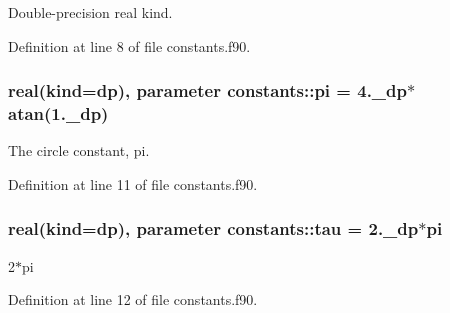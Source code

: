 Double-\/precision real kind. 



Definition at line 8 of file constants.\+f90.

\subsubsection[{\texorpdfstring{pi}{pi}}]{\setlength{\rightskip}{0pt plus 5cm}real(kind={\bf dp}), parameter constants\+::pi = 4.\+\_\+dp$\ast$atan(1.\+\_\+dp)}\hypertarget{namespaceconstants_a6b3bd07bfab41d9c44a226e58a25abb2}{}\label{namespaceconstants_a6b3bd07bfab41d9c44a226e58a25abb2}


The circle constant, pi. 



Definition at line 11 of file constants.\+f90.

\subsubsection[{\texorpdfstring{tau}{tau}}]{\setlength{\rightskip}{0pt plus 5cm}real(kind={\bf dp}), parameter constants\+::tau = 2.\+\_\+dp$\ast$pi}\hypertarget{namespaceconstants_a55d6f125a01979f87b18c4128c21cab3}{}\label{namespaceconstants_a55d6f125a01979f87b18c4128c21cab3}


2$\ast$pi 



Definition at line 12 of file constants.\+f90.

